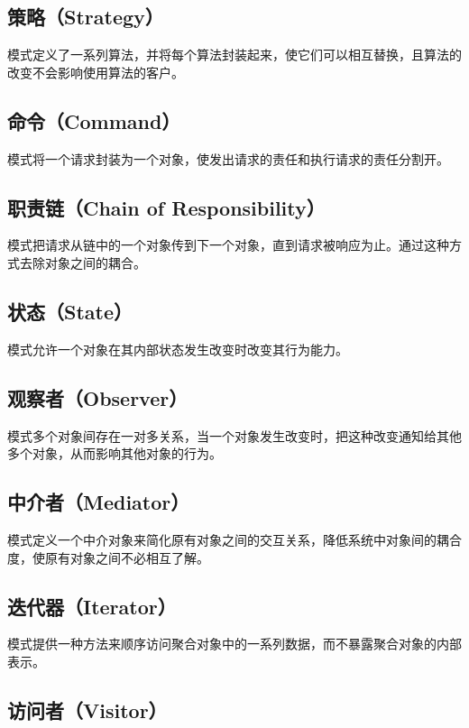 \documentclass[cn,black,12pt,normal]{elegantnote}
\begin{document}
\subsection{策略（Strategy）}

模式定义了一系列算法，并将每个算法封装起来，使它们可以相互替换，且算法的改变不会影响使用算法的客户。

\subsection{命令（Command）}

模式将一个请求封装为一个对象，使发出请求的责任和执行请求的责任分割开。

\subsection{职责链（Chain of Responsibility）}

模式把请求从链中的一个对象传到下一个对象，直到请求被响应为止。通过这种方式去除对象之间的耦合。

\subsection{状态（State）}

模式允许一个对象在其内部状态发生改变时改变其行为能力。

\subsection{观察者（Observer）}

模式多个对象间存在一对多关系，当一个对象发生改变时，把这种改变通知给其他多个对象，从而影响其他对象的行为。

\subsection{中介者（Mediator）}

模式定义一个中介对象来简化原有对象之间的交互关系，降低系统中对象间的耦合度，使原有对象之间不必相互了解。


\subsection{迭代器（Iterator）}

模式提供一种方法来顺序访问聚合对象中的一系列数据，而不暴露聚合对象的内部表示。


\subsection{访问者（Visitor）}
\end{document}
